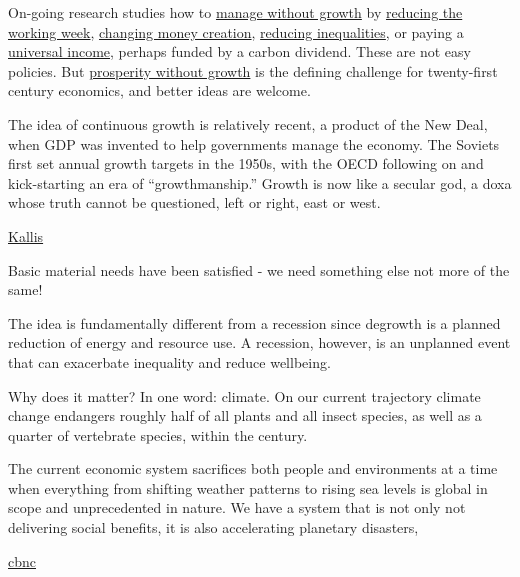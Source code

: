 \documentclass[
]{book}
\begin{document}
On-going research studies how to \href{https://www.e-elgar.com/shop/gbp/managing-without-growth-second-edition-9781785367397.html}{manage without growth} by \href{https://www.europeanfinancialreview.com/a-four-day-workweek-a-policy-for-improving-employment-and-environmental-conditions-in-europe/}{reducing the working week}, \href{https://positivemoney.org/publications/escaping-growth-dependency/}{changing money creation}, \href{https://www.tandfonline.com/doi/full/10.1080/09538259.2020.1769293}{reducing inequalities}, or paying a \href{https://greattransition.org/gti-forum/basic-income-standing}{universal income}, perhaps funded by a carbon dividend. These are not easy policies. But \href{https://www.routledge.com/Prosperity-without-Growth-Foundations-for-the-Economy-of-Tomorrow/Jackson/p/book/9781138935419}{prosperity without growth} is the defining challenge for twenty-first century economics, and better ideas are welcome.

The idea of continuous growth is relatively recent, a product of the New Deal, when GDP was invented to help governments manage the economy. The Soviets first set annual growth targets in the 1950s, with the OECD following on and kick-starting an era of ``growthmanship.'' Growth is now like a secular god, a doxa whose truth cannot be questioned, left or right, east or west.

\href{https://www.cato-unbound.org/2021/04/14/giorgos-kallis/why-malthuss-gospel-growth-was-still-wrong}{Kallis}

Basic material needs have been satisfied - we need something else not more of the same!

The idea is fundamentally different from a recession since
degrowth is a planned reduction of energy and resource use.
A recession, however, is an unplanned event that can exacerbate inequality and reduce wellbeing.

Why does it matter?
In one word: climate.
On our current trajectory climate change endangers roughly half of all plants and all insect species,
as well as a quarter of vertebrate species, within the century.

The current economic system sacrifices both people and environments at a time when everything from shifting weather patterns to rising sea levels is global in scope and unprecedented in nature.
We have a system that is not only not delivering social benefits, it is also accelerating planetary disasters,

\href{https://www.cnbc.com/amp/2021/02/19/degrowth-pushing-social-wellbeing-and-climate-over-economic-growth.html}{cbnc}
\end{document}
